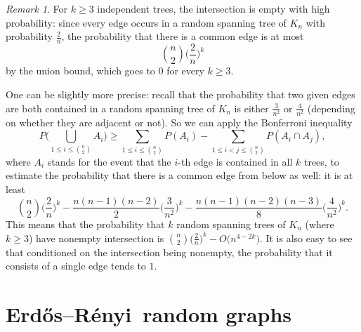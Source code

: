 \documentclass[a4paper,12pt,reqno]{amsart}
\theoremstyle{remark}
\newtheorem{remark}{Remark}
\newcommand{\ER}{Erd\H{o}s--R\'enyi\ }
\begin{document}
\begin{remark}
For $k \geq 3$ independent trees, the intersection is empty with high probability: since every edge occurs in a random spanning tree of $K_n$ with probability $\frac{2}{n}$, the probability that there is a common edge is at most
\[\binom{n}{2} \Big( \frac{2}{n} \Big)^k\]
by the union bound, which goes to $0$ for every $k \geq 3$.

One can be slightly more precise: recall that the probability that two given edges are both contained in a random spanning tree of $K_n$ is either $\frac{3}{n^2}$ or $\frac{4}{n^2}$ (depending on whether they are adjacent or not). So we can apply the Bonferroni inequality
\[P \Big( \bigcup_{1 \leq i \leq \binom{n}{2}} A_i \Big) \geq \sum_{1 \leq i \leq \binom{n}{2}} P(A_i) - \sum_{1 \leq i < j \leq \binom{n}{2}} P(A_i \cap A_j),\]
where $A_i$ stands for the event that the $i$-th edge is contained in all $k$ trees, to estimate the probability that there is a common edge from below as well: it is at least
\[\binom{n}{2} \Big( \frac{2}{n} \Big)^k - \frac{n(n-1)(n-2)}{2} \Big( \frac{3}{n^2} \Big)^k - \frac{n(n-1)(n-2)(n-3)}{8} \Big( \frac{4}{n^2} \Big)^k.\]
This means that the probability that $k$ random spanning trees of $K_n$ (where $k \geq 3$) have nonempty intersection is $\binom{n}{2} \big( \frac{2}{n} \big)^k - O\big(n^{4-2k}\big)$.
It is also easy to see that conditioned on the intersection being nonempty, the probability that it consists of a single edge tends to $1$.
\end{remark}



\section{\ER random graphs}\label{sec:Gnp}
\end{document}

